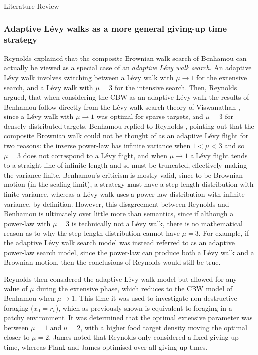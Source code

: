 \begin{section}{Literature Review \label{sec:litreview}}
\subsubsection{Adaptive L\'{e}vy walks as a more general giving-up time strategy}

Reynolds \cite{Reynolds_2008_comment} explained that the composite Brownian walk search of Benhamou \cite{Benhamou_2007} can actually be viewed as a special case of an \emph{adaptive L\'{e}vy walk search}. 
An adaptive L\'{e}vy walk involves switching between a L\'{e}vy walk with $\mu \to 1$ for the extensive search, and a L\'{e}vy walk with $\mu=3$ for the intensive search.
Then, Reynolds argued, that when considering the CBW as an adaptive L\'{e}vy walk the results of Benhamou \cite{Benhamou_2007} follow directly from the L\'{e}vy walk search theory of Viswanathan \etal \cite{Viswanathan_1999}, since a L\'{e}vy walk with $\mu \to 1$ was optimal for sparse targets, and $\mu=3$ for densely distributed targets.
Benhamou \cite{Benhamou_2008} replied to Reynolds \cite{Reynolds_2008_comment}, pointing out that the composite Brownian walk could not be thought of as an adaptive L\'{e}vy flight for two reasons: the inverse power-law has infinite variance when $1 < \mu < 3$ and so $\mu =3$ does not correspond to a L\'{e}vy flight, and when $\mu \to 1$ a L\'{e}vy flight tends to a straight line of infinite length and so must be truncated, effectively making the variance finite. 
Benhamou's criticism is mostly valid, since to be Brownian motion (in the scaling limit), a strategy must have a step-length distribution with finite variance, whereas a L\'{e}vy walk uses a power-law distribution with infinite variance, by definition.
However, this disagreement between Reynolds and Benhamou is ultimately over little more than semantics, since if although a power-law with $\mu =3$ is technically not a L\'{e}vy walk, there is no mathematical reason as to why the step-length distribution cannot have $\mu=3$. For example, if the adaptive L\'{e}vy walk search model was instead referred to as an adaptive power-law search model, since the power-law can produce both a L\'{e}vy walk and a Brownian motion, then the conclusions of Reynolds \cite{Reynolds_2008_comment} would still be true.

Reynolds \cite{Reynolds_2009_adaptive} then considered the adaptive L\'{e}vy walk model but allowed for any value of $\mu$ during the extensive phase, which reduces to the CBW model of Benhamou \cite{Benhamou_2007} when $\mu \to 1$.
This time it was used to investigate non-destructive foraging ($x_0=r_v$), which as previously shown \cite{Reynolds_2008_comment} is equivalent to foraging in a patchy environment.
It was determined that the optimal extensive parameter was between $\mu=1$ and $\mu=2$, with a higher food target density moving the optimal closer to $\mu=2$.
James \etal \cite{James_2011} noted that Reynolds \cite{Reynolds_2009_adaptive} only considered a fixed giving-up time, whereas Plank and James \cite{Plank_2008} optimised over all giving-up times.


\end{section}
